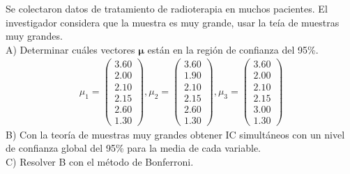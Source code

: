 \documentclass[12pt]{article}
\newenvironment{problem}[2][Problema]{\begin{trivlist}
\item[\hskip \labelsep {\bfseries #1}\hskip \labelsep {\bfseries #2.}]}{\end{trivlist}}
\begin{document}
\begin{problem}{2}
Se colectaron datos de tratamiento de radioterapia en muchos pacientes. El investigador considera que la muestra es muy grande, usar la teía de muestras muy grandes.\\
 A) Determinar cuáles vectores $\mathbf{\mu}$ están en la región de confianza del 95\%. 
\begin{align*}
\mu_1 = \begin{pmatrix} 3.60 \\ 2.00 \\ 2.10 \\ 2.15 \\ 2.60 \\ 1.30 \end{pmatrix}, 
\mu_2 = \begin{pmatrix} 3.60 \\ 1.90 \\ 2.10 \\ 2.15 \\ 2.60 \\ 1.30 \end{pmatrix}, 
\mu_3 = \begin{pmatrix} 3.60 \\ 2.00 \\ 2.10 \\ 2.15 \\ 3.00 \\ 1.30 \end{pmatrix}
\end{align*}
B) Con la teoría de muestras muy grandes obtener IC simultáneos con un nivel de confianza global del 95\% para la media de cada variable.\\
C) Resolver B con el método de Bonferroni.
\end{problem}
\end{document}
